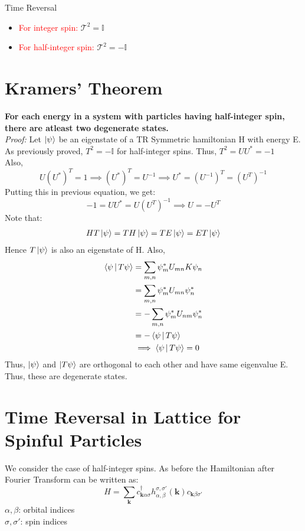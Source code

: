 \documentclass[12pt, oneside, listof=totoc,dvipsnames]{scrbook}
\begin{document}
\begin{chapter}{Time Reversal}
		\begin{itemize}
			\item \textcolor{red}{For integer spin:} $\mathcal{T}^2 =\mathbb{I}$ 
			\item \textcolor{red}{For half-integer spin:} $\mathcal{T}^2 =-\mathbb{I}$ 
		\end{itemize}
		\section{Kramers' Theorem}
		\textbf{For each energy in a system with particles having half-integer spin, there are atleast two degenerate states.}\\[0.3cm]
		\textit{Proof:} Let $\ket{\psi}$ be an eigenstate of a TR Symmetric hamiltonian H with energy E. As previously proved, 
		$T^2=-\mathbb{I}$ for half-integer spins. Thus, $T^2=UU^*=-1$\\[0.2cm]
		Also,  $$U(U^*)^T=1 \implies (U^*)^T=U^{-1}\implies U^*=(U^{-1})^T=(U^{T})^{-1} $$Putting this in previous equation, we get: 
		$$-1=UU^*=U(U^{T})^{-1} \implies U=-U^T$$
		\noindent
		Note that: \begin{align*}
			HT\ket{\psi} = TH\ket{\psi}=TE\ket{\psi}=ET\ket{\psi}
		\end{align*}
		Hence $T\ket{\psi}$ is also an eigenstate of H.
		Also,
		\begin{align*}
			\Braket{\psi|T\psi} &= \sum \limits_{m,n} \psi^*_m U_{mn}K \psi_n \\
			&=\sum \limits_{m,n} \psi^*_m U_{mn} \psi^*_n\\
			&= - \sum \limits_{m,n} \psi^*_m U_{nm} \psi^*_n\\
			&=- \Braket{\psi|T\psi}\\
			&\implies \Braket{\psi|T\psi}=0 
		\end{align*}
		Thus, $\ket{\psi}$ and $\ket{T\psi}$ are orthogonal to each other and have same eigenvalue E. Thus, these are degenerate states. 
		
		
		
		\section{Time Reversal in Lattice for Spinful Particles}
		We consider the case of half-integer spins. As before the Hamiltonian after Fourier Transform can be written as:
		\[H= \sum \limits_\mathbf{k} c^\dagger_{\mathbf{k}\alpha\sigma}h^{\sigma,\sigma'}_{\alpha,\beta}(\mathbf{k})c_{\mathbf{k}\beta\sigma'}\]
		$\alpha, \beta$: orbital indices\\
		$\sigma, \sigma'$: spin indices\\
		

\end{chapter}
\end{document}
